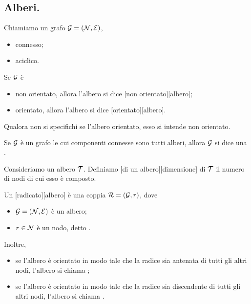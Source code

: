 \subsection{Alberi.}
\label{Relazioni_Alberi}
\begin{Definition}
	Chiamiamo  un grafo $\mathcal{G} = (\mathcal{N}, \mathcal{E})$,
	\begin{itemize}
		\item connesso;
		\item aciclico.
	\end{itemize}
  Se $\mathcal{G}$ \`e
  \begin{itemize}
    \item non orientato, allora l'albero si dice
      [non orientato][albero];
    \item orientato, allora l'albero si dice
      [orientato][albero].
  \end{itemize}
  Qualora non si specifichi se l'albero orientato, esso si intende non
orientato.
\end{Definition}
\begin{Definition}
	Se $\mathcal{G}$ \`e un grafo le cui componenti connesse sono tutti alberi,
  allora $\mathcal{G}$ si dice una .
\end{Definition}
\begin{Definition}
	Consideriamo un albero $\mathcal{T}$. Definiamo
  [di un albero][dimensione]
  di $\mathcal{T}$ il numero di nodi di cui esso \`e composto.
\end{Definition}
\begin{Definition}
  Un [radicato][albero] \`e una coppia
  $\mathcal{R} = (\mathcal{G},r)$, dove
  \begin{itemize}
    \item $\mathcal{G} = (\mathcal{N}, \mathcal{E})$ \`e un albero;
    \item $r \in \mathcal{N}$ \`e un nodo, detto .
  \end{itemize}
  Inoltre,
  \begin{itemize}
    \item se l'albero \`e orientato in modo tale che la radice sia antenata
      di tutti gli altri nodi, l'albero si chiama ;
    \item se l'albero \`e orientato in modo tale che la radice sia discendente
      di tutti gli altri nodi, l'albero si chiama .
  \end{itemize}
\end{Definition}
